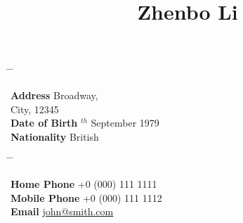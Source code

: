 

\title{Zhenbo Li} %


\parbox{0.5\textwidth}{ %
	\begin{tabbing} %
		\hspace{3cm} \= \hspace{4cm} \= \kill %
		
		{\bf Address}  Broadway,\\ %
		\> City, 12345 \\ %
		{\bf Date of Birth} $^{th}$ September 1979 \\ %
		{\bf Nationality} \> British %
		
	\end{tabbing}
}
	\hfill %
	\parbox{0.5\textwidth}{ %
		\begin{tabbing} %
			\hspace{3cm} \= \hspace{4cm} \= \kill %
			
			{\bf Home Phone} \> +0 (000) 111 1111 \\ %
			{\bf Mobile Phone} \> +0 (000) 111 1112 \\ %
			{\bf Email} \> \href{mailto:john@smith.com}{john@smith.com} \\ %
			
		\end{tabbing}} 
